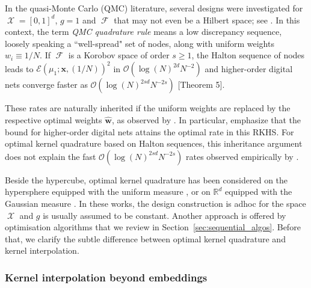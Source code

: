 \documentclass[twoside,11pt]{book}
\numberwithin{theorem}{chapter}
\numberwithin{definition}{chapter}
\numberwithin{proposition}{chapter}
\numberwithin{corollary}{chapter}
\numberwithin{example}{chapter}
\numberwithin{lemma}{chapter}
\DeclareMathOperator{\F}{\mathcal{F}}
\DeclareMathOperator{\X}{\mathcal{X}}
\begin{document}
In the quasi-Monte Carlo (QMC) literature, several designs were investigated for $\X = [0,1]^{d}$, $g = 1$ and $\F$ that may not even be a Hilbert space; see \citep{DiPi10}. In this context, the term \emph{QMC quadrature rule} means a low discrepancy sequence, loosely speaking a ``well-spread" set of nodes, along with uniform weights $w_{i} \equiv 1/N$. If $\F$ is a Korobov space of order $s \geq 1$, the Halton sequence of nodes \citep{Hal64} leads to $\mathcal{E}(\mu_1; \bm{x}, (1/N))^2$ in $\mathcal{O}(\log(N)^{2d} N^{-2})$ and higher-order digital nets converge faster as $\mathcal{O}(\log(N)^{2sd} N^{-2s})$ \citep{DiPi14}[Theorem 5].

These rates are naturally inherited if the uniform weights are replaced by the respective optimal weights $\hat{\bm{w}}$, as observed by \cite{BOGOS2019}. In particular, \cite{BOGOS2019} emphasize that the bound for higher-order digital nets attains the optimal rate in this RKHS.
For optimal kernel quadrature based on Halton sequences, this inheritance argument does not explain the fast $\mathcal{O}(\log(N)^{2sd} N^{-2s})$ rates observed empirically by \cite{Oett17}.

Beside the hypercube, optimal kernel quadrature has been considered on the hypersphere equipped with the uniform measure \citep{EhGrCh19}, or on $\mathbb{R}^{d}$ equipped with the Gaussian measure \citep{KaSa19}. In these works, the design construction is adhoc for the space $\X$ and
$g$ is usually assumed to be constant. Another approach is offered by optimisation algorithms that we review in Section~\ref{sec:sequential_algos}. Before that, we clarify the subtle difference between optimal kernel quadrature and kernel interpolation.

\subsubsection{Kernel interpolation beyond embeddings}\label{sec:review_kernel_interpolation_beyond_mu}
\end{document}
